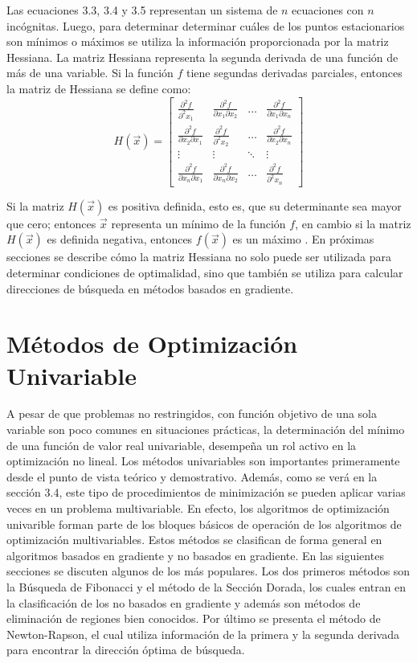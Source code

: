 Las ecuaciones 3.3, 3.4 y 3.5 representan un sistema de $n$ ecuaciones con $n$ incógnitas. Luego, para determinar determinar cuáles de los puntos estacionarios son mínimos o máximos se utiliza la información proporcionada por la matriz Hessiana. La matriz Hessiana representa la segunda derivada de una función de más de una variable. Si la función $f$ tiene segundas derivadas parciales, entonces la matriz de Hessiana se define como:
\begin{equation}
 H(\vec{x})=
 \begin{bmatrix}
    \frac{\partial^2 f}{\partial^2 x_1} & \frac{\partial^2 f}{\partial x_1 \partial x_2} & \dots  & \frac{\partial^2 f}{\partial x_1 \partial x_n} \\
    \frac{\partial^2 f}{\partial x_2 \partial x_1} & \frac{\partial^2 f}{\partial^2 x_2} & \dots  & \frac{\partial^2 f}{\partial x_2 \partial x_n}\\
    \vdots & \vdots & \ddots & \vdots \\
    \frac{\partial^2 f}{\partial x_n \partial x_1} & \frac{\partial^2 f}{\partial x_n \partial x_2} & \dots  & \frac{\partial^2 f}{\partial^2 x_n }
\end{bmatrix}
 \end{equation}

Si la matriz $H(\vec{x})$ es positiva definida, esto es, que su determinante sea mayor que cero; entonces $\vec{x}$ representa un mínimo de la función $f$, en cambio si la matriz $H(\vec{x})$ es definida negativa, entonces $f(\vec{x})$ es un máximo \cite{antoniou_practical_2007}. En próximas secciones se describe cómo la matriz Hessiana no solo puede ser utilizada para determinar condiciones de optimalidad, sino que también se utiliza para calcular direcciones de búsqueda en métodos basados en gradiente.

\section{Métodos de Optimización Univariable}
A pesar de que problemas no restringidos, con función objetivo de una sola variable son poco comunes en situaciones prácticas, la determinación del mínimo de una función de valor real univariable, desempeña un rol activo en la optimización no lineal. Los métodos univariables son importantes primeramente desde el punto de vista teórico y demostrativo. Además, como se verá en la sección 3.4, este tipo de procedimientos de minimización se pueden aplicar varias veces en un problema multivariable. En efecto, los algoritmos de optimización univarible forman parte de los bloques básicos de operación de los algoritmos de optimización multivariables.  Estos métodos se clasifican de forma general en algoritmos basados en gradiente y no basados en gradiente. En las siguientes secciones se discuten algunos de los más populares. Los dos primeros métodos son la Búsqueda de Fibonacci y el método de la Sección Dorada, los cuales entran en la clasificación de los no basados en gradiente y además son métodos de eliminación de regiones bien conocidos. Por último se presenta el método de Newton-Rapson, el cual utiliza información de la primera y la segunda derivada para encontrar la dirección óptima de búsqueda. 

